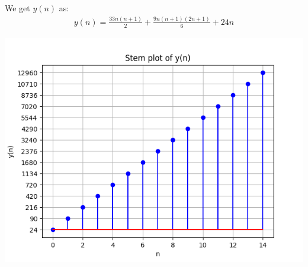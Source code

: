 \documentclass[journal,12pt,twocolumn]{IEEEtran}
\theoremstyle{remark}
\begin{document}
        We get $y(n)$ as: 
        \begin{align}
            y(n)=\frac{33n(n+1)}{2}+\frac{9n(n+1)(2 n+1)}{6}+24n
        \end{align}
        
        \includegraphics[width=\columnwidth]{figs/plot.png}

        
            
           
             
             
             
        

        













\renewcommand{\thefigure}{\theenumi}
\renewcommand{\thetable}{\theenumi}
\end{document}
